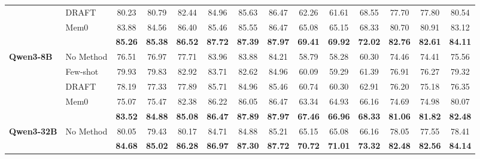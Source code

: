 \documentclass[11pt]{article}
\newcommand{\ours}{\texttt{ExpG}}
\begin{document}
\begin{table}[t]
\begin{tabular}{@{}ll*{12}{c}@{}}
        & DRAFT     & 80.23 & 80.79 & 82.44 & 84.96 & 85.63 & 86.47 & 62.26 & 61.61 & 68.55 & 77.70 & 77.80 & 80.54 \\
        & Mem0      & 83.88 & 84.56 & 86.40 & 85.46 & 85.55 & 86.47 & 65.08 & 65.15 & 68.33 & 80.70 & 80.91 & 83.12 \\
        & \cellcolor{gray!15}{\ours} & \cellcolor{gray!15}\textbf{85.26} & \cellcolor{gray!15}\textbf{85.38} & \cellcolor{gray!15}\textbf{86.52} & \cellcolor{gray!15}\textbf{87.72} & \cellcolor{gray!15}\textbf{87.39} & \cellcolor{gray!15}\textbf{87.97} & \cellcolor{gray!15}\textbf{69.41} & \cellcolor{gray!15}\textbf{69.92} & \cellcolor{gray!15}\textbf{72.02} & \cellcolor{gray!15}\textbf{82.76} & \cellcolor{gray!15}\textbf{82.61} & \cellcolor{gray!15}\textbf{84.11} \\
    \midrule
    \multirow{5}{*}{\textbf{Qwen3-8B}}
        & No Method & 76.51 & 76.97 & 77.71 & 83.96 & 83.88 & 84.21 & 58.79 & 58.28 & 60.30 & 74.46 & 74.41 & 75.56 \\
        & Few-shot  & 79.93 & 79.83 & 82.92 & 83.71 & 82.62 & 84.96 & 60.09 & 59.29 & 61.39 & 76.91 & 76.27 & 79.32 \\
        & DRAFT     & 78.19 & 77.33 & 77.89 & 85.71 & 84.96 & 85.46 & 60.74 & 60.30 & 62.91 & 76.20 & 75.18 & 76.35 \\
        & Mem0      & 75.07 & 75.47 & 82.38 & 86.22 & 86.05 & 86.47 & 63.34 & 64.93 & 66.16 & 74.69 & 74.98 & 80.07 \\
        & \cellcolor{gray!15}{\ours} & \cellcolor{gray!15}\textbf{83.52} & \cellcolor{gray!15}\textbf{84.88} & \cellcolor{gray!15}\textbf{85.08} & \cellcolor{gray!15}\textbf{86.47} & \cellcolor{gray!15}\textbf{87.89} & \cellcolor{gray!15}\textbf{87.97} & \cellcolor{gray!15}\textbf{67.46} & \cellcolor{gray!15}\textbf{66.96} & \cellcolor{gray!15}\textbf{68.33} & \cellcolor{gray!15}\textbf{81.06} & \cellcolor{gray!15}\textbf{81.82} & \cellcolor{gray!15}\textbf{82.48} \\
    \midrule
    \multirow{2}{*}{\textbf{Qwen3-32B}}
        & No Method & 80.05 & 79.43 & 80.17 & 84.71 & 84.88 & 85.21 & 65.15 & 65.08 & 66.16 & 78.05 & 77.55 & 78.41 \\
        & \cellcolor{gray!15}{\ours} & \cellcolor{gray!15}\textbf{84.68} & \cellcolor{gray!15}\textbf{85.02} & \cellcolor{gray!15}\textbf{86.28} & \cellcolor{gray!15}\textbf{86.97} & \cellcolor{gray!15}\textbf{87.30} & \cellcolor{gray!15}\textbf{87.72} & \cellcolor{gray!15}\textbf{70.72} & \cellcolor{gray!15}\textbf{71.01} & \cellcolor{gray!15}\textbf{73.32} & \cellcolor{gray!15}\textbf{82.48} & \cellcolor{gray!15}\textbf{82.56} & \cellcolor{gray!15}\textbf{84.14} \\

\end{tabular}
\end{table}
\end{document}
